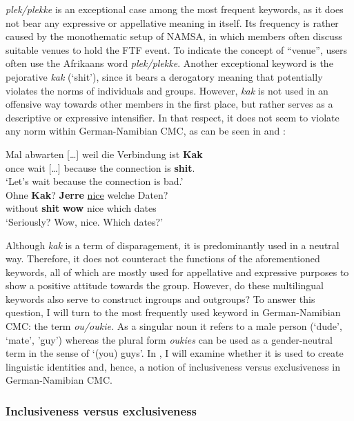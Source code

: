\documentclass[output=paper]{langsci/langscibook}
\begin{document}
\textit{plek/plekke} is an exceptional case among the most frequent keywords, as it does not bear any expressive or appellative meaning in itself. Its frequency is rather caused by the monothematic setup of NAMSA, in which members often discuss suitable venues to hold the FTF event. To indicate the concept of “venue”, users often use the Afrikaans word \textit{plek/plekke}. Another exceptional keyword is the pejorative \textit{kak} (‘shit’), since it bears a derogatory meaning that potentially violates the norms of individuals and groups. However, \textit{kak} is not used in an offensive way towards other members in the first place, but rather serves as a descriptive or expressive intensifier. In that respect, it does not seem to violate any norm within German-Namibian CMC, as can be seen in  and :

\ea\label{ex:radke:9}
	\gll Mal abwarten […] weil die Verbindung ist \textbf{Kak}\\
		once wait […] because the connection is \textbf{shit}.\\
	\glt `Let’s wait because the connection is bad.'\\
\ex\label{ex:radke:10}
	\gll Ohne \textbf{Kak}? \textbf{Jerre} \underline{nice} welche Daten? \\
		without \textbf{shit} \textbf{wow} nice which dates\\
	\glt `Seriously? Wow, nice. Which dates?'\\
\z

Although \textit{kak} is a term of disparagement, it is predominantly used in a neutral way. Therefore, it does not counteract the functions of the aforementioned keywords, all of which are mostly used for appellative and expressive purposes to show a positive attitude towards the group. However, do these multilingual keywords also serve to construct ingroups and outgroups? To answer this question, I will turn to the most frequently used keyword in German-Namibian CMC: the term \textit{ou/oukie.} As a singular noun it refers to a male person (‘dude’, ‘mate’, ’guy’) whereas the plural form \textit{oukies} can be used as a gender-neutral term in the sense of ‘(you) guys’. In , I will examine whether it is used to create linguistic identities and, hence, a notion of inclusiveness versus exclusiveness in German-Namibian CMC.

 
  \subsubsection{Inclusiveness versus exclusiveness}
 \label{sec:radke:3.4.2}
\end{document}
